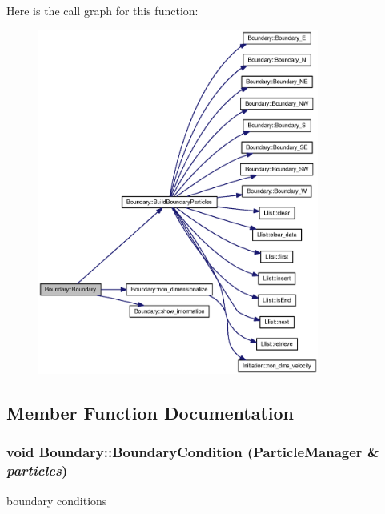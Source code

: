 Here is the call graph for this function:\nopagebreak
\begin{figure}[H]
\begin{center}
\leavevmode
\includegraphics[width=262pt]{classBoundary_8fe88473063d74e67a5932f2e4d2e517_cgraph}
\end{center}
\end{figure}


\subsection{Member Function Documentation}
\hypertarget{classBoundary_bedd190ee91482e4e59b2a613ab25d57}{
\subsubsection[{BoundaryCondition}]{\setlength{\rightskip}{0pt plus 5cm}void Boundary::BoundaryCondition ({\bf ParticleManager} \& {\em particles})}}
\label{classBoundary_bedd190ee91482e4e59b2a613ab25d57}


boundary conditions 



